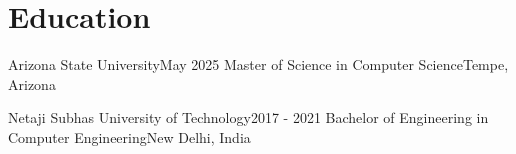 \section{Education}
    \resumeSubHeadingListStart

    \resumeSubheading
    {Arizona State University}{May 2025\textit{}}
    {Master of Science in Computer Science}{Tempe, Arizona}
    \resumeItemListStart
    \resumeItemListEnd

    \resumeSubheading
    {Netaji Subhas University of Technology}{2017 - 2021}
    {Bachelor of Engineering in Computer Engineering}{New Delhi, India}
    \resumeSubHeadingListEnd